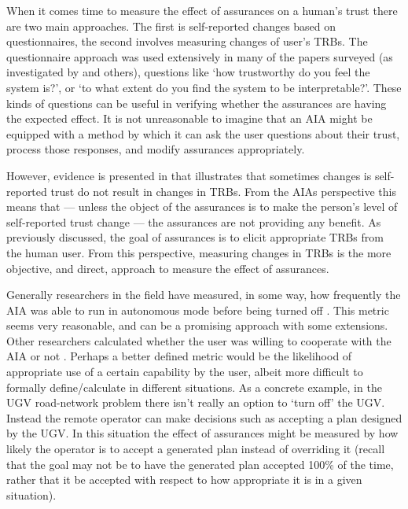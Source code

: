     When it comes time to measure the effect of assurances on a human's trust there are two main approaches. The first is self-reported changes based on questionnaires, the second involves measuring changes of user's TRBs. The questionnaire approach was used extensively in many of the papers surveyed (as investigated by \cite{Mcknight2011-gv,Muir1996-gt,Wickens1999-la,Salem2015-md,Kaniarasu2013-ho} and others), questions like `how trustworthy do you feel the system is?', or `to what extent do you find the system to be interpretable?'. These kinds of questions can be useful in verifying whether the assurances are having the expected effect. It is not unreasonable to imagine that an AIA might be equipped with a method by which it can ask the user questions about their trust, process those responses, and modify assurances appropriately.
    
    However, evidence is presented in \cite{Dzindolet2003-ts} that illustrates that sometimes changes is self-reported trust do not result in changes in TRBs. From the AIAs perspective this means that --- unless the object of the assurances is to make the person's level of self-reported trust change --- the assurances are not providing any benefit. As previously discussed, the goal of assurances is to elicit appropriate TRBs from the human user. From this perspective, measuring changes in TRBs is the more objective, and direct, approach to measure the effect of assurances.

    Generally researchers in the field have measured, in some way, how frequently the AIA was able to run in autonomous mode before being turned off \cite{Freedy2007-sg,Desai2012-rc}. This metric seems very reasonable, and can be a promising approach with some extensions. Other researchers calculated whether the user was willing to cooperate with the AIA or not \cite{Salem2015-md,Wu2016-ei,Bainbridge2011-pl}. Perhaps a better defined metric would be the likelihood of appropriate use of a certain capability by the user, albeit more difficult to formally define/calculate in different situations. As a concrete example, in the UGV road-network problem there isn't really an option to `turn off' the UGV. Instead the remote operator can make decisions such as accepting a plan designed by the UGV. In this situation the effect of assurances might be measured by how likely the operator is to accept a generated plan instead of overriding it (recall that the goal may not be to have the generated plan accepted 100\% of the time, rather that it be accepted with respect to how appropriate it is in a given situation).

